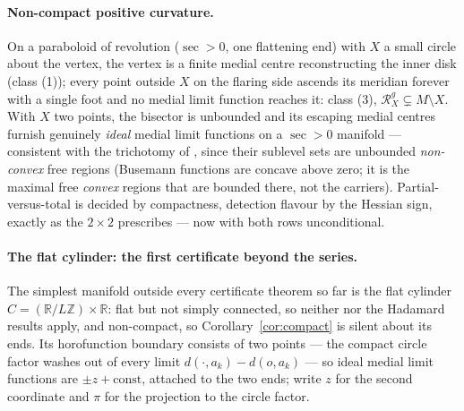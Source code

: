 \documentclass[11pt]{article}
\theoremstyle{remark}
\newcommand{\R}{\mathbb{R}}
\newcommand{\X}{X}
\newcommand{\Rg}{\mathcal{R}^{g}_{\X}}
\newcommand{\sect}{\operatorname{sec}}
\begin{document}
\paragraph{Non-compact positive curvature.} On a paraboloid of
revolution ($\sect>0$, one flattening end) with $\X$ a small circle
about the vertex, the vertex is a finite medial centre reconstructing
the inner disk (class (1)); every point outside $\X$ on the flaring
side ascends its meridian forever with a single foot and no medial
limit function reaches it: class (3), $\Rg\subsetneq M\setminus\X$.
With $\X$ two points, the bisector is unbounded and its escaping
medial centres furnish genuinely \emph{ideal} medial limit functions
on a $\sect>0$ manifold --- consistent with the trichotomy of
\cite{Tri}, since their sublevel sets are unbounded \emph{non-convex}
free regions (Busemann functions are concave above zero; it is the
maximal free \emph{convex} regions that are bounded there, not the
carriers). Partial-versus-total is decided by compactness, detection
flavour by the Hessian sign, exactly as the $2\times2$ prescribes ---
now with both rows unconditional.

\paragraph{The flat cylinder: the first certificate beyond the
series.} The simplest manifold outside every certificate theorem so
far is the flat cylinder $C=(\R/L\mathbb{Z})\times\R$: flat but not
simply connected, so neither \cite{Bia} nor the Hadamard results
apply, and non-compact, so Corollary~\ref{cor:compact} is silent
about its ends. Its horofunction boundary consists of two points ---
the compact circle factor washes out of every limit
$d(\cdot,a_{k})-d(o,a_{k})$ --- so ideal medial limit functions are
$\pm z+\mathrm{const}$, attached to the two ends; write $z$ for the
second coordinate and $\pi$ for the projection to the circle factor.
\end{document}
